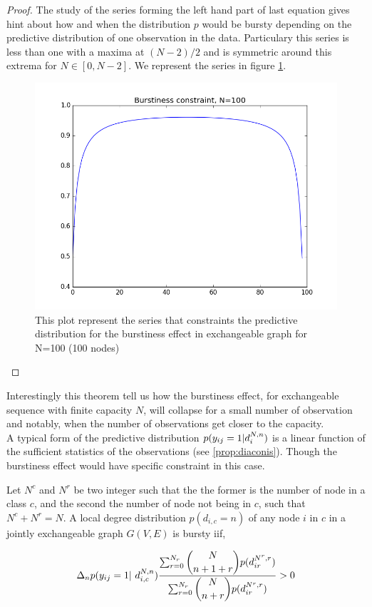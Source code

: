 \begin{proof}
	The study of the series forming the left hand part of last equation gives hint about how and when the distribution $p$ would be bursty depending on the predictive distribution of one observation in the data. Particulary this series is less than one with a maxima at $(N-2)/2$ and is symmetric around this extrema for $N \in [0, N-2]$. We represent the series in figure \ref{fig:bp}.
	
	
	\begin{figure}[h]
		\centering
		\includegraphics[scale=0.4]{img/bp}
		\caption{This plot represent the series that constraints the predictive distribution for the burstiness effect in exchangeable graph for N=100 (100 nodes)}
		\label{fig:bp}
	\end{figure}

\label{b-theorem}
\end{proof}

Interestingly this theorem tell us how the burstiness effect, for exchangeable sequence with finite capacity $N$, will collapse for a small number of observation and notably, when the number of observations get closer to the capacity.\\

A typical form of the predictive distribution $p(y_{ij}=1 | d_i^{N,n})$ is a linear function of the sufficient statistics of the observations (see \ref{prop:diaconis}). Though the burstiness effect would have specific constraint in this case.

\begin{theorem} \label{th:burst_exch}
	Let $N^c$ and $N^r$ be two integer such that the the former is the number of node in a class $c$, and the second the number of node not being in $c$, such that $N^c+N^r = N$. A local degree distribution $p(d_{i,c}=n)$ of any node $i$ in $c$ in a jointly exchangeable graph $G(V,E)$ is bursty iif,
	
	\begin{equation}
\Delta_n  p(y_{ij}=1 | d_{i,c}^{N,n}) \frac{\sum_{r=0}^{N_r}\dbinom{N}{n+1+r} p(d_{ir}^{N^r,r})}{\sum_{r=0}^{N_r} \dbinom{N}{n+r} p(d_{ir}^{N^r,r}) } > 0
	\end{equation}
	
\end{theorem}

